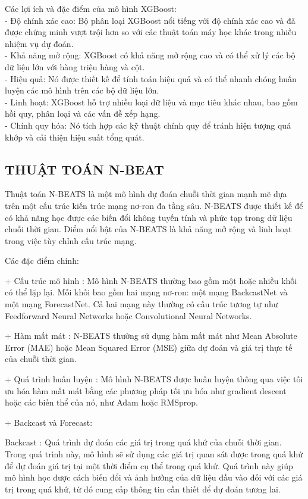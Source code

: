 \documentclass[conference]{IEEEtran}
\begin{document}
       Các lợi ích và đặc điểm của mô hình XGBoost:\\
       - Độ chính xác cao: Bộ phân loại XGBoost nổi tiếng với độ chính xác cao và đã được chứng minh vượt trội hơn so với các thuật toán máy học khác trong nhiều nhiệm vụ dự đoán.\\
       - Khả năng mở rộng: XGBoost có khả năng mở rộng cao và có thể xử lý các bộ dữ liệu lớn với hàng triệu hàng và cột.\\
       - Hiệu quả: Nó được thiết kế để tính toán hiệu quả và có thể nhanh chóng huấn luyện các mô hình trên các bộ dữ liệu lớn.\\
       - Linh hoạt: XGBoost hỗ trợ nhiều loại dữ liệu và mục tiêu khác nhau, bao gồm hồi quy, phân loại và các vấn đề xếp hạng.\\
       - Chính quy hóa: Nó tích hợp các kỹ thuật chính quy để tránh hiện tượng quá khớp và cải thiện hiệu suất tổng quát.


    \subsection{THUẬT TOÁN N-BEAT}

    Thuật toán N-BEATS là một mô hình dự đoán chuỗi thời gian mạnh mẽ dựa trên một cấu trúc kiến trúc mạng nơ-ron đa tầng sâu. N-BEATS được thiết kế để có khả năng học được các biến đổi không tuyến tính và phức tạp trong dữ liệu chuỗi thời gian. Điểm nổi bật của N-BEATS là khả năng mở rộng và linh hoạt trong việc tùy chỉnh cấu trúc mạng. 

    Các đặc điểm chính: 
    
        + Cấu trúc mô hình : Mô hình N-BEATS thường bao gồm một hoặc nhiều khối có thể lặp lại. Mỗi khối bao gồm hai mạng nơ-ron: một mạng BackcastNet và một mạng ForecastNet. Cả hai mạng này thường có cấu trúc tương tự như Feedforward Neural Networks hoặc Convolutional Neural Networks.
    
        + Hàm mất mát : N-BEATS thường sử dụng hàm mất mát như Mean Absolute Error (MAE) hoặc Mean Squared Error (MSE) giữa dự đoán và giá trị thực tế của chuỗi thời gian. 
    
        + Quá trình huấn luyện : Mô hình N-BEATS được huấn luyện thông qua việc tối ưu hóa hàm mất mát bằng các phương pháp tối ưu hóa như gradient descent hoặc các biến thể của nó, như Adam hoặc RMSprop.
    
        + Backcast và Forecast:
        
            Backcast : Quá trình dự đoán các giá trị trong quá khứ của chuỗi thời gian. Trong quá trình này, mô hình sẽ sử dụng các giá trị quan sát được trong quá khứ để dự đoán giá trị tại một thời điểm cụ thể trong quá khứ. Quá trình này giúp mô hình học được cách biến đổi và ảnh hưởng của dữ liệu đầu vào đối với các giá trị trong quá khứ, từ đó cung cấp thông tin cần thiết để dự đoán tương lai.
    
\end{document}
